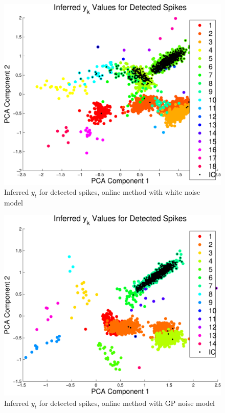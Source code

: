 \documentclass{article} %
\begin{document}
\begin{figure}
\includegraphics[width=\textwidth]{ykwn}
\caption{Inferred $y_t$ for detected spikes, online method with white noise model}
\end{figure}
\begin{figure}
\includegraphics[width=\textwidth]{yk}
\caption{Inferred $y_t$ for detected spikes, online method with GP noise model}
\end{figure}
\end{document}
